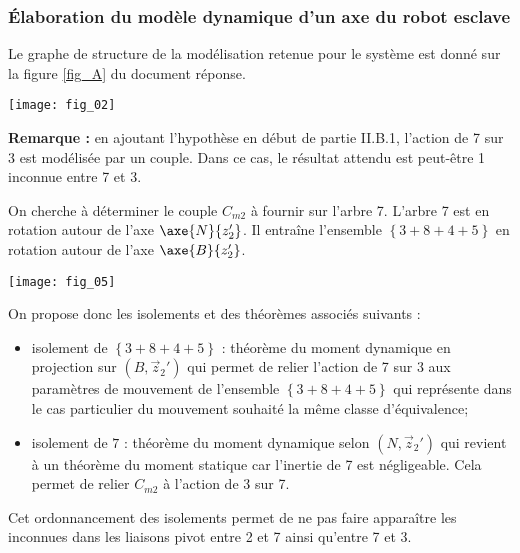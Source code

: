 \subsubsection{Élaboration du modèle dynamique d'un axe du robot esclave}
Le graphe de structure de la modélisation retenue pour le système est donné sur la figure \ref{fig_A} du document réponse.\\
\ifprof
\begin{corrige}
\begin{center}
\texttt{[image: fig\_02]}
\end{center}

\textbf{Remarque :} en ajoutant l'hypothèse en début de partie II.B.1, l'action de 7 sur 3 est modélisée par un couple. Dans ce cas, le résultat attendu est peut-être 1 inconnue entre 7 et 3.
\end{corrige}
\else
\fi


\ifprof
\begin{corrige}
On cherche à déterminer le couple $C_{m2}$ à fournir sur l'arbre 7. L'arbre 7 est en rotation autour de l'axe $\axe{N}{z_2'}$. Il entraîne l'ensemble $\left\{3+8+4+5\right\}$ en rotation autour de l'axe $\axe{B}{z_2'}$.

\begin{center}
\texttt{[image: fig\_05]}
\end{center}

On propose donc les isolements et des théorèmes associés suivants : 
\begin{itemize}
\item isolement de $\left\{3+8+4+5\right\}$ : théorème du moment dynamique en projection sur $\left(B,\overrightarrow{z}_2'\right)$ qui permet de relier l'action de 7 sur 3 aux paramètres de mouvement de l'ensemble $\left\{3+8+4+5\right\}$ qui représente dans le cas particulier du mouvement souhaité la même classe d'équivalence;
\item isolement de $7$ : théorème du moment dynamique selon $\left(N,\overrightarrow{z}_2'\right)$ qui revient à un théorème du moment statique car l'inertie de 7 est négligeable. Cela permet de relier $C_{m2}$ à l'action de 3 sur 7.
\end{itemize}
Cet ordonnancement des isolements permet de ne pas faire apparaître les inconnues dans les liaisons pivot entre 2 et 7 ainsi qu'entre 7 et 3. 
\end{corrige}
\else
\fi


